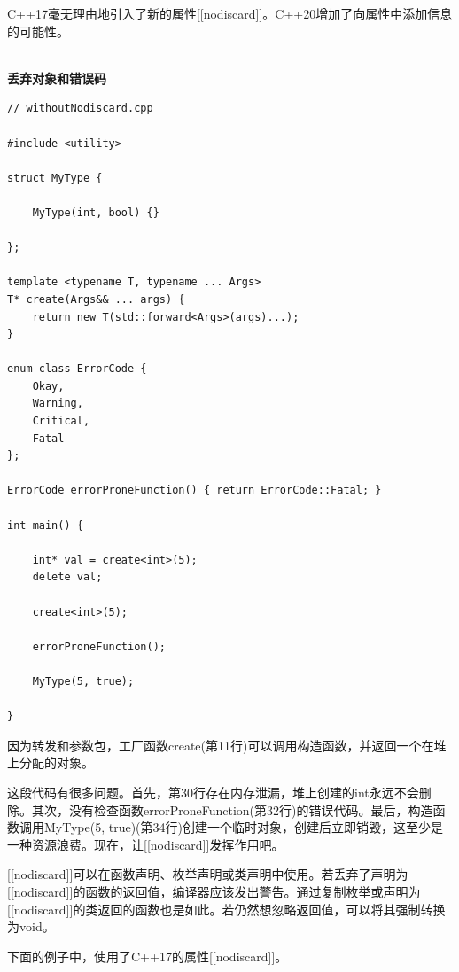 
C++17毫无理由地引入了新的属性[[nodiscard]]。C++20增加了向属性中添加信息的可能性。

\hspace*{\fill} \\ %
\noindent
\textbf{丢弃对象和错误码}
\begin{lstlisting}[style=styleCXX]
// withoutNodiscard.cpp

#include <utility>

struct MyType {

	MyType(int, bool) {}

};

template <typename T, typename ... Args>
T* create(Args&& ... args) {
	return new T(std::forward<Args>(args)...);
}

enum class ErrorCode {
	Okay,
	Warning,
	Critical,
	Fatal
};

ErrorCode errorProneFunction() { return ErrorCode::Fatal; }

int main() {

	int* val = create<int>(5);
	delete val;
	
	create<int>(5);
	
	errorProneFunction();
	
	MyType(5, true);

}
\end{lstlisting}

因为转发和参数包，工厂函数create(第11行)可以调用构造函数，并返回一个在堆上分配的对象。

这段代码有很多问题。首先，第30行存在内存泄漏，堆上创建的int永远不会删除。其次，没有检查函数errorProneFunction(第32行)的错误代码。最后，构造函数调用MyType(5, true)(第34行)创建一个临时对象，创建后立即销毁，这至少是一种资源浪费。现在，让[[nodiscard]]发挥作用吧。

[[nodiscard]]可以在函数声明、枚举声明或类声明中使用。若丢弃了声明为[[nodiscard]]的函数的返回值，编译器应该发出警告。通过复制枚举或声明为[[nodiscard]]的类返回的函数也是如此。若仍然想忽略返回值，可以将其强制转换为void。

下面的例子中，使用了C++17的属性[[nodiscard]]。

